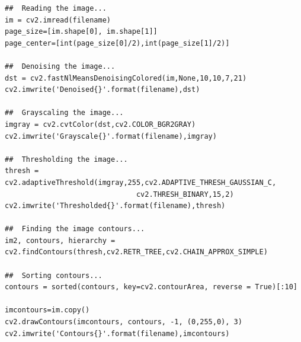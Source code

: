 \documentclass{article}
\begin{document}
{\begin{lstlisting}
##  Reading the image...
im = cv2.imread(filename)
page_size=[im.shape[0], im.shape[1]]
page_center=[int(page_size[0]/2),int(page_size[1]/2)]

##  Denoising the image...
dst = cv2.fastNlMeansDenoisingColored(im,None,10,10,7,21)
cv2.imwrite('Denoised{}'.format(filename),dst)

##  Grayscaling the image...
imgray = cv2.cvtColor(dst,cv2.COLOR_BGR2GRAY)
cv2.imwrite('Grayscale{}'.format(filename),imgray)

##  Thresholding the image...
thresh = cv2.adaptiveThreshold(imgray,255,cv2.ADAPTIVE_THRESH_GAUSSIAN_C,
                               cv2.THRESH_BINARY,15,2)
cv2.imwrite('Thresholded{}'.format(filename),thresh)

##  Finding the image contours...
im2, contours, hierarchy = cv2.findContours(thresh,cv2.RETR_TREE,cv2.CHAIN_APPROX_SIMPLE)

##  Sorting contours...
contours = sorted(contours, key=cv2.contourArea, reverse = True)[:10]

imcontours=im.copy()
cv2.drawContours(imcontours, contours, -1, (0,255,0), 3)
cv2.imwrite('Contours{}'.format(filename),imcontours)

\end{lstlisting}

}
\end{document}
